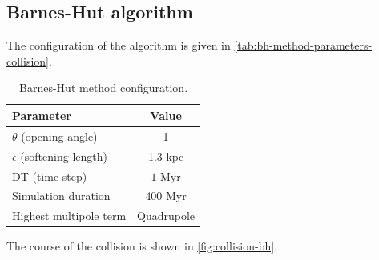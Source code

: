 \subsection{Barnes-Hut algorithm}
The configuration of the algorithm is given in \autoref{tab:bh-method-parameters-collision}.
\begin{table}[htp]
    \centering
    \caption{Barnes-Hut method configuration.}
    \label{tab:bh-method-parameters-collision}
    \begin{tabular}{lc}
        \toprule
        \textbf{Parameter}            & \textbf{Value} \\
        \midrule
        $\theta$ (opening angle)      & 1              \\
        $\epsilon$ (softening length) & 1.3 kpc        \\
        DT (time step)                & $1$ Myr        \\
        Simulation duration           & 400 Myr        \\
        Highest multipole term        & Quadrupole     \\
        \bottomrule
    \end{tabular}
\end{table}
The course of the collision is shown in \autoref{fig:collision-bh}.

